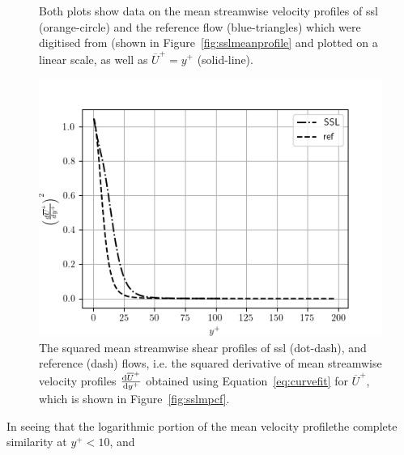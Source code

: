 \begin{figure}[htbp]
	\centering
		\caption[Mean streamwise velocity profiles of SSL and reference flows, and analytical approximations thereof]{Both plots show data on the mean streamwise velocity profiles of \gls{ssl} (orange-circle) and the reference flow (blue-triangles) which were digitised from \textcite{viotti2009} (shown in Figure~\ref{fig:sslmeanprofile} and plotted on a linear scale, as well as $\overline{U}^+=y^+$ (solid-line). }
	\label{fig:sslmplin}
\end{figure}

\begin{figure}[htbp]
	\centering
	\includegraphics[width=0.485\linewidth]{project/fig/sslmeandiff.png}
	\caption[Mean streamwise shear profile squared of SSL and reference flows]{The squared mean streamwise shear profiles of \gls{ssl} (dot-dash), and reference (dash) flows, i.e. the squared derivative of mean streamwise velocity profiles $\dv{\overline{U}^{+}}{y^{+}} $ obtained using Equation~\eqref{eq:curvefit} for $\overline{U}^{+}$, which is shown in Figure~\ref{fig:sslmpcf}.}
	\label{fig:sslmpdiff}
\end{figure}
In seeing that the logarithmic portion of the mean velocity profilethe complete similarity at $y^{+}<10$, and 
